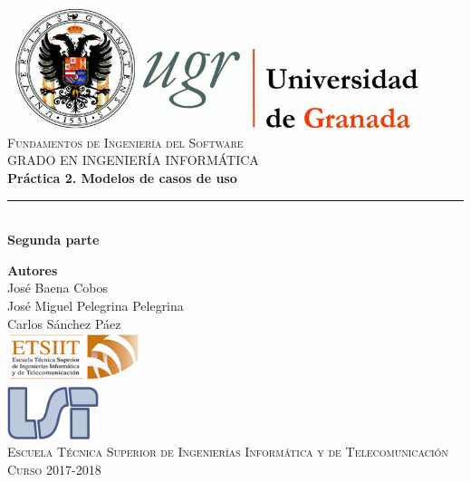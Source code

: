 \documentclass[12pt,spanish]{article}
\begin{document}
\begin{titlepage}

\newlength{\centeroffset}
\setlength{\centeroffset}{-0.5\oddsidemargin}
\addtolength{\centeroffset}{0.5\evensidemargin}
\thispagestyle{empty}

\noindent\hspace*{\centeroffset}\begin{minipage}{\textwidth}

\centering
\includegraphics[width=0.9\textwidth]{logo_ugr.jpg}\\[1.4cm]

\textsc{ \Large Fundamentos de Ingeniería del Software\\[0.2cm]}
\textsc{GRADO EN INGENIERÍA INFORMÁTICA}\\[1cm]

{\Huge\bfseries Práctica 2. Modelos de casos de uso\\
}
\noindent\rule[-1ex]{\textwidth}{3pt}\\[3.5ex]
{\large\bfseries Segunda parte}
\end{minipage}

\vspace{2.5cm}
\noindent\hspace*{\centeroffset}
\begin{minipage}{\textwidth}
\centering

\textbf{Autores}\\ {José Baena Cobos \\ José Miguel Pelegrina Pelegrina\\Carlos Sánchez Páez}\\[2.5ex]
\includegraphics[width=0.3\textwidth]{etsiit_logo.png}\\[0.1cm]
\vspace{1.5cm}
\includegraphics[width=0.2\textwidth]{lsi.png}\\[0.1cm]
\vspace{1cm}
\textsc{Escuela Técnica Superior de Ingenierías Informática y de Telecomunicación}\\
\vspace{1cm}
\textsc{Curso 2017-2018}
\end{minipage}
\end{titlepage}
\tableofcontents
\thispagestyle{empty}
\listoffigures
\listoftables
\setcounter{page}{1}
\end{document}
